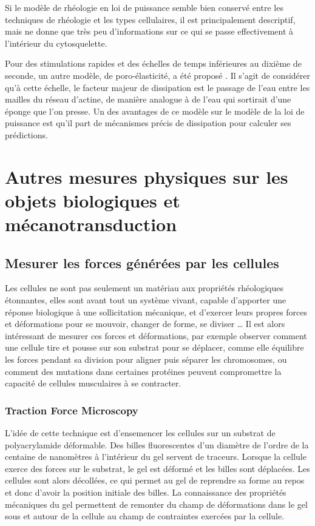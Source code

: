 Si le modèle de rhéologie en loi de puissance semble bien conservé entre les techniques de rhéologie et les types cellulaires, il est principalement descriptif, mais ne donne que très peu d'informations sur ce qui se passe effectivement à l'intérieur du cytosquelette. 

Pour des stimulations rapides et des échelles de temps inférieures au dixième de seconde, un autre modèle, de poro-élasticité, a été proposé \parencite{moeendarbary_cytoplasm_2013}. 
Il s'agit de considérer qu'à cette échelle, le facteur majeur de dissipation est le passage de l'eau entre les mailles du réseau d'actine, de manière analogue à de l'eau qui sortirait d'une éponge que l'on presse.  
Un des avantages de ce modèle sur le modèle de la loi de puissance est qu'il part de mécanismes précis de dissipation pour calculer ses prédictions. 

\section{Autres mesures physiques sur les objets biologiques et mécanotransduction}

 



\subsection{Mesurer les forces générées par les cellules}

Les cellules ne sont pas seulement un matériau aux propriétés rhéologiques étonnantes, elles sont avant tout un système vivant, capable d'apporter une réponse biologique à une sollicitation mécanique, et d'exercer leurs propres forces et déformations pour se mouvoir, changer de forme, se diviser \dots 
Il est alors intéressant de mesurer ces forces et déformations, par exemple observer comment une cellule tire et pousse sur son substrat pour se déplacer, comme elle équilibre les forces pendant sa division pour aligner puis séparer les chromosomes, ou comment des mutations dans certaines protéines peuvent compromettre la capacité de cellules musculaires à se contracter.

\subsubsection{Traction Force Microscopy}

L'idée de cette technique est d'ensemencer les cellules sur un substrat de polyacrylamide déformable. 
Des billes fluorescentes d'un diamètre de l'ordre de la centaine de nanomètres à l'intérieur du gel servent de traceurs. 
Lorsque la cellule exerce des forces sur le substrat, le gel est déformé et les billes sont déplacées. 
Les cellules sont alors décollées, ce qui permet au gel de reprendre sa forme au repos et donc d'avoir la position initiale des billes. 
La connaissance des propriétés mécaniques du gel permettent de remonter du champ de déformations dans le gel sous et autour de la cellule au champ de contraintes exercées par la cellule. 

